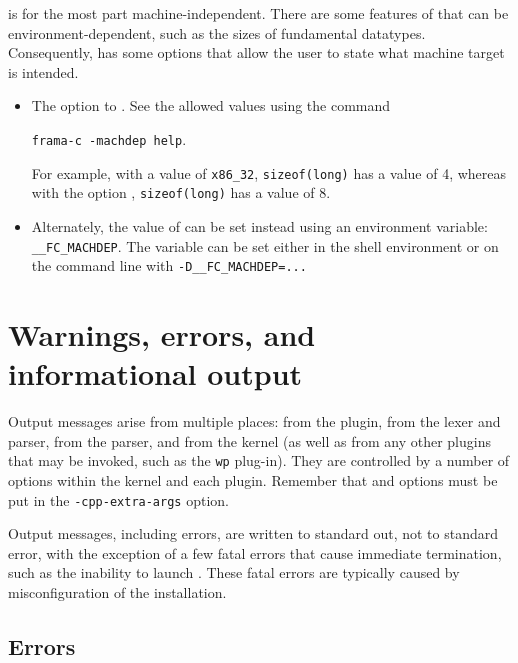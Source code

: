 \acslpp is for the most part machine-independent. 
There are some features of \cpp that can be environment-dependent, such as the sizes of fundamental datatypes. 
Consequently, \framac has some options that allow the user to state what machine target is intended. 

\begin{itemize}
\item The  option to \framac. See the allowed values using the command\\
\centerline{ \lstinline|frama-c -machdep help|.}
 For example, with a value of \lstinline|x86_32|, \lstinline|sizeof(long)| has a value of 4, whereas with the option , \lstinline|sizeof(long)| has a value of 8.
\item Alternately, the value of  can be set instead using an environment variable: \lstinline|__FC_MACHDEP|. The variable can be set either in the shell environment or on the command line with \lstinline|-D__FC_MACHDEP=...|

\end{itemize}


\section{Warnings, errors, and informational output}

Output messages arise from multiple places: from the \fcl plugin, from the \irg lexer and parser, from the \clang parser, and from the \framac kernel (as well as from any other plugins that may be invoked, such as the \texttt{wp} plug-in). 
They are controlled by a number of options within the \framac kernel and each plugin. Remember that \cl and \irg options must be put in the \lstinline|-cpp-extra-args| option.

Output messages, including errors, are written to standard out, not to standard error, with the exception of a few fatal errors that cause immediate termination, such as the inability to launch \irg. These fatal errors are typically caused by misconfiguration of the installation.

\subsection{Errors}

